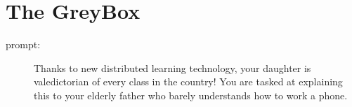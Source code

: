 \section*{The GreyBox}

\begin{description}
\item[prompt:] Thanks to new distributed learning technology, your daughter is valedictorian of every class in the country! You are tasked at explaining this to your elderly father who barely understands how to work a phone.
\end{description}
